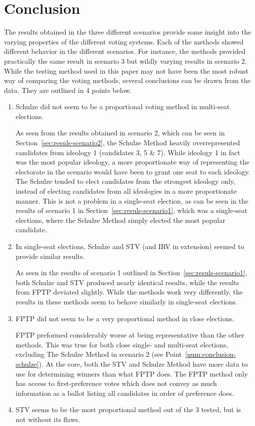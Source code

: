 \documentclass[12pt]{article}
\begin{document}
\section{Conclusion}
The results obtained in the three different scenarios provide some insight into the varying properties of the different voting systems. Each of the methods showed different behavior in the different scenarios. For instance, the methods provided practically the same result in scenario 3 but wildly varying results in scenario 2. While the testing method used in this paper may not have been the most robust way of comparing the voting methods, several conclusions can be drawn from the data. They are outlined in 4 points below.
\begin{enumerate}
	\item Schulze did not seem to be a proportional voting method in multi-seat elections.\label{num:conclusion-schulze}
	
	As seen from the results obtained in scenario 2, which can be seen in Section~\ref{sec:resuls-scenario2}, the Schulze Method heavily overrepresented candidates from ideology 1 (candidates 3, 5 \& 7). While ideology 1 in fact was the most popular ideology, a more proportionate way of representing the electorate in the scenario would have been to grant one seat to each ideology. The Schulze tended to elect candidates from the strongest ideology only, instead of electing candidates from all ideologies in a more proportionate manner. This is not a problem in a single-seat election, as can be seen in the results of scenario 1 in Section~\ref{sec:resuls-scenario1}, which was a single-seat elections, where the Schulze Method simply elected the most popular candidate.
	\item In single-seat elections, Schulze and STV (and IRV in extension) seemed to provide similar results. 
	
	As seen in the results of scenario 1 outlined in Section~\ref{sec:resuls-scenario1}, both Schulze and STV produced nearly identical results, while the results from FPTP deviated slightly. While the methods work very differently, the results in these methods seem to behave similarly in single-seat elections.
	\item FPTP did not seem to be a very proportional method in close elections. 

	FPTP preformed considerably worse at being representative than the other methods. This was true for both close single- and multi-seat elections, excluding The Schulze Method in scenario 2 (see Point~\ref{num:conclusion-schulze}). At the core, both the STV and Schulze Method have more data to use for determining winners than what FPTP does. The FPTP method only has access to first-preference votes which does not convey as much information as a ballot listing all candidates in order of preference does.
	\item STV seems to be the most proportional method out of the 3 tested, but is not without its flaws.


\end{enumerate}
\end{document}
